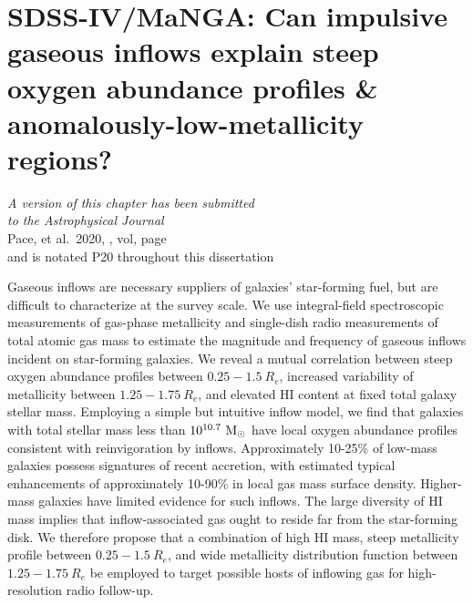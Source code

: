 \chapter[Gaseous Inflows \& Steep Metallicity Profiles]{SDSS-IV/MaNGA: Can impulsive gaseous inflows explain steep oxygen abundance profiles \& anomalously-low-metallicity regions?}
\label{chapter3}

\vfill

\begin{flushright}
    \fixspacing %
    \textit{A version of this chapter has been submitted\\
        to the \emph{Astrophysical Journal}} \\ \vspace{1ex}
    Pace, et al.\ 2020, \apj, vol, page \\ \vspace{1ex}
    and is notated P20 throughout this dissertation
\end{flushright}

\vspace*{1in} %

\cleardoublepage

\begin{chabstract}
Gaseous inflows are necessary suppliers of galaxies' star-forming fuel, but are difficult to characterize at the survey scale. We use integral-field spectroscopic measurements of gas-phase metallicity and single-dish radio measurements of total atomic gas mass to estimate the magnitude and frequency of gaseous inflows incident on star-forming galaxies. We reveal a mutual correlation between steep oxygen abundance profiles between $0.25-1.5 ~ R_e$, increased variability of metallicity between $1.25-1.75 ~ R_e$, and elevated HI content at fixed total galaxy stellar mass. Employing a simple but intuitive inflow model, we find that galaxies with total stellar mass less than $10^{10.7} ~ {\rm M_{\odot}}$ have local oxygen abundance profiles consistent with reinvigoration by inflows. Approximately 10-25\% of low-mass galaxies possess signatures of recent accretion, with estimated typical enhancements of approximately 10-90\% in local gas mass surface density. Higher-mass galaxies have limited evidence for such inflows. The large diversity of HI mass implies that inflow-associated gas ought to reside far from the star-forming disk. We therefore propose that a combination of high HI mass, steep metallicity profile between $0.25-1.5 ~ R_e$, and wide metallicity distribution function between $1.25 - 1.75 ~ R_e$ be employed to target possible hosts of inflowing gas for high-resolution radio follow-up.
\end{chabstract}
\cleardoublepage

